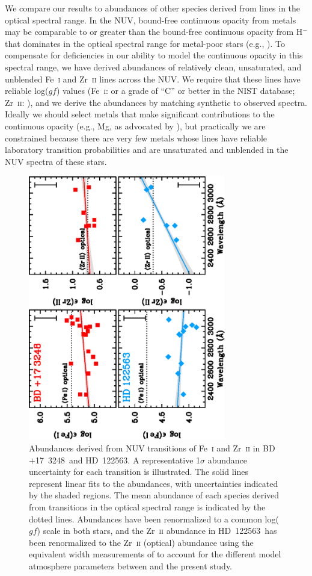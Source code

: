 \documentclass{emulateapj}
\def\bd{\mbox{BD~$+$17~3248}}
\def\hd{\mbox{HD~122563}}
\begin{document}
We compare our results to abundances of other species 
derived from lines in the optical spectral range.
In the NUV, bound-free continuous opacity from metals may be comparable
to or greater than the bound-free continuous opacity from H$^{-}$
that dominates in the optical spectral range for metal-poor stars
(e.g., \citealt{travis68}).
To compensate for deficiencies in our ability to model the continuous
opacity in this spectral range, 
we have derived abundances of relatively clean, unsaturated, and 
unblended Fe~\textsc{i} and
Zr~\textsc{ii} lines across the NUV.
We require that these lines have reliable log($gf$) values
(Fe~\textsc{i}: \citealt{obrian91} or a grade of ``C'' or better in 
the NIST database; 
Zr~\textsc{ii}: \citealt{malcheva06}), and we derive the abundances
by matching synthetic to observed spectra.
Ideally we should select metals that make significant contributions
to the continuous opacity (e.g., Mg, as advocated by \citealt{bell01}), 
but practically we are constrained 
because there are very few metals whose lines
have reliable laboratory transition probabilities
and are unsaturated and unblended in the NUV spectra
of these stars.

\begin{figure}
\begin{center}
\includegraphics[angle=270,width=3.4in]{f2.eps}
\end{center}
\caption{
\label{fezr}
Abundances derived from NUV transitions of Fe~\textsc{i} and
Zr~\textsc{ii} in \bd\ and \hd.
A representative 1$\sigma$ abundance uncertainty for each
transition is illustrated.
The solid lines represent linear fits to the abundances,
with uncertainties indicated by the shaded regions.
The mean abundance of each species derived from transitions 
in the optical spectral range is indicated by the dotted lines.
Abundances have been renormalized to a common log($gf$) scale
in both stars, and the Zr~\textsc{ii} abundance in
\hd\ has been renormalized to the Zr~\textsc{ii} (optical)
abundance using the equivalent width measurements of \citet{honda04}
to account for the different model atmosphere parameters
between \citet{honda06} and the present study.
}
\end{figure}
\end{document}
